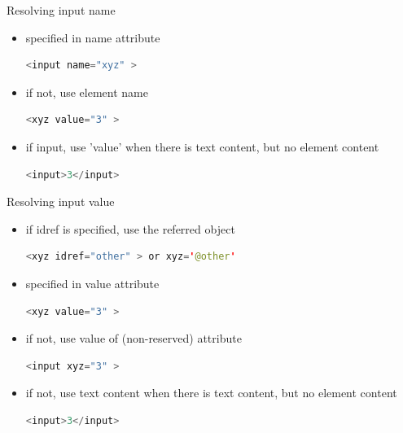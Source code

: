 \documentclass{beamer}
\theoremstyle{definition}
\begin{document}
\begin{frame}[containsverbatim]
{Resolving input name}

\begin{itemize}
\item specified in name attribute
\begin{lstlisting}[language=java]
    <input name="xyz" >
\end{lstlisting}
\item if not, use element name
\begin{lstlisting}[language=java]
    <xyz value="3" >
\end{lstlisting}
\item if input, use 'value' when there is text content, but no element content
\begin{lstlisting}[language=java]
    <input>3</input>
\end{lstlisting}
\end{itemize}
\end{frame}


\begin{frame}[containsverbatim]
{Resolving input value}

\begin{itemize}
\item if idref is specified, use the referred object
\begin{lstlisting}[language=java]
    <xyz idref="other" > or xyz='@other'
\end{lstlisting}
\item specified in value attribute
\begin{lstlisting}[language=java]
    <xyz value="3" >
\end{lstlisting}
\item if not, use value of (non-reserved) attribute
\begin{lstlisting}[language=java]
    <input xyz="3" >
\end{lstlisting}
\item if not, use text content when there is text content, but no element content
\begin{lstlisting}[language=java]
    <input>3</input>
\end{lstlisting}
\end{itemize}
\end{frame}
\end{document}
